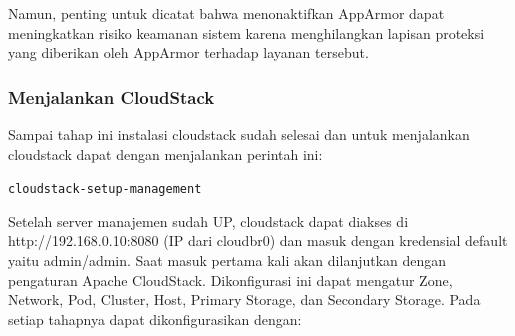 Namun, penting untuk dicatat bahwa menonaktifkan AppArmor dapat meningkatkan risiko keamanan sistem karena menghilangkan lapisan proteksi yang diberikan oleh AppArmor terhadap layanan tersebut.


\subsubsection{Menjalankan CloudStack}
Sampai tahap ini instalasi cloudstack sudah selesai dan untuk menjalankan cloudstack dapat dengan menjalankan perintah ini:

\texttt{cloudstack-setup-management}

Setelah server manajemen sudah UP, cloudstack dapat diakses di http://192.168.0.10:8080 (IP dari cloudbr0) dan masuk dengan kredensial default yaitu admin/admin. Saat masuk pertama kali akan dilanjutkan dengan pengaturan Apache CloudStack. Dikonfigurasi ini dapat mengatur Zone, Network, Pod, Cluster, Host, Primary Storage, dan Secondary Storage. Pada setiap tahapnya dapat dikonfigurasikan dengan:

